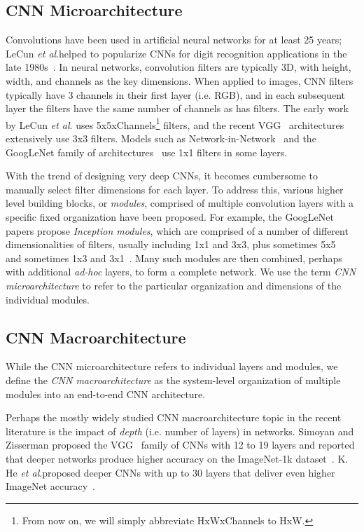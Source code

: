 \documentclass{article} \usepackage{iclr2017_conference,times}
\newcommand{\etal}{\textit{et al}.}
\renewcommand{\cite}{\citep}
\def\vsp{\vspace{-0.15in}}
\begin{document}
\subsection{CNN Microarchitecture}
\vsp

Convolutions have been used in artificial neural networks for at least 25 years; LeCun \etal helped to popularize CNNs for digit recognition applications in the late 1980s~\cite{LeCun89}.
In neural networks, convolution filters are typically 3D, with height, width, and channels as the key dimensions.
When applied to images, CNN filters typically have 3 channels in their first layer (i.e. RGB), and in each subsequent layer  the filters have the same number of channels as  has filters.
The early work by LeCun \etal\cite{LeCun89} uses 5x5xChannels\footnote{From now on, we will simply abbreviate HxWxChannels to HxW.} filters, and the recent VGG~\cite{VGG-19} architectures extensively use 3x3 filters.
Models such as Network-in-Network~\cite{NiN} and the GoogLeNet family of architectures~\cite{googlenet,googleBN,googlenet-v3,googlenet-v4} use 1x1 filters in some layers.

With the trend of designing very deep CNNs, it becomes cumbersome to manually select filter dimensions for each layer.
To address this, various higher level building blocks, or {\em modules}, comprised of multiple convolution layers with a specific fixed organization have been proposed.
For example, the GoogLeNet papers propose {\em Inception modules}, which are comprised of a number of different dimensionalities of filters, usually including 1x1 and 3x3, plus sometimes 5x5~\cite{googlenet} and sometimes 1x3 and 3x1~\cite{googlenet-v3}.
Many such modules are then combined, perhaps with additional {\em ad-hoc} layers, to form a complete network. 
We use the term {\em CNN microarchitecture} to refer to the particular organization and dimensions of the individual modules. 



\subsection{CNN Macroarchitecture}
\vsp

While the CNN microarchitecture refers to individual layers and modules, we define the {\em CNN macroarchitecture} as the system-level organization of multiple modules into an end-to-end CNN architecture.

Perhaps the mostly widely studied CNN macroarchitecture topic in the recent literature is the impact of {\em depth} (i.e. number of layers) in networks.
Simoyan and Zisserman proposed the VGG~\cite{VGG-19} family of CNNs with 12 to 19 layers and reported that deeper networks produce higher accuracy on the ImageNet-1k dataset~\cite{imagenet}.
K. He \etal proposed deeper CNNs with up to 30 layers that deliver even higher ImageNet accuracy~\cite{He2015}.
\end{document}
